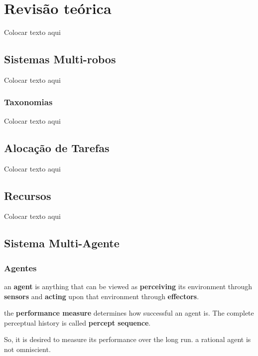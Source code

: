 \chapter[Revisão teórica]{Revisão teórica} \label{cap:cap1}
Colocar texto aqui 

\section{Sistemas Multi-robos} \label{sec:sec1_2}
Colocar texto aqui

\subsection{Taxonomias} \label{sub:sub1_2_1}
Colocar texto aqui

\section{Alocação de Tarefas} \label{sec:sec1_3}
Colocar texto aqui

\section{Recursos} \label{sec:sec1_4}

Colocar texto aqui

\section{Sistema Multi-Agente}

\subsection{Agentes}


an \textbf{agent} is anything that can be viewed as \textbf{perceiving} its environment through \textbf{sensors} and \textbf{acting} upon that environment through \textbf{effectors}.


the \textbf{performance measure} determines how successful an agent is. The complete perceptual history is called \textbf{percept sequence}.

So, it is desired to measure its performance over the long run.
a rational agent is not omniscient. 

